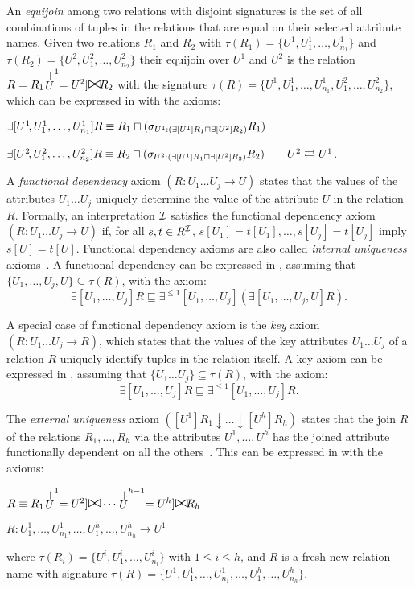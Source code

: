 \documentclass[envcountsame,draft]{llncs}
\begin{document}
An \emph{equijoin} among two relations with disjoint signatures is the set of all combinations of tuples in the relations that are equal on their selected attribute names. Given two relations $R_1$ and $R_2$ with $\tau(R_1)=\{U^1,U^1_1,\ldots,U^1_{n_1}\}$ and $\tau(R_2)=\{U^2,U^2_1,\ldots,U^2_{n_2}\}$ their equijoin over $U^1$ and $U^2$ is the relation  $R = R_1\!\stackrel[U^1=U^2]{}{\mathlarger{\mathlarger{\mathlarger{\bowtie}}}}\!R_2$ with the signature $\tau(R)=\{U^1,U^1_1,\ldots,U^1_{n_1},U^2_1,\ldots,U^2_{n_2}\}$, which can be expressed in \DLRp with the axioms:

\vspace{1ex}
$
\exists[U^1\!,U^1_1,\ldots,U^1_{n_1}]R\equiv R_1 \sqcap (\sigma_{U^1 : (\exists[U^1]R_1\sqcap \exists[U^2]R_2)} R_1)$

$
\exists[U^2\!,U^2_1,\ldots,U^2_{n_2}]R\equiv R_2 \sqcap (\sigma_{U^2 : (\exists[U^1]R_1\sqcap \exists[U^2]R_2)} R_2) \hspace{2em}U^2\rightleftarrows U^1
$.

\vspace{1ex}
A \emph{functional dependency} axiom $(R:U_1\ldots U_j \rightarrow U)$ states that the values of the attributes $U_1\ldots U_j$ uniquely determine the value of the attribute $U$ in the relation $R$. Formally, an interpretation $\mathcal{I} $ satisfies the functional dependency axiom $(R:U_1\ldots U_j \rightarrow U)$ if, for all $s,t\in R^\mathcal{I}$, $s[U_1] = t[U_1], \ldots, s[U_j] = t[U_j]$ imply $s[U] = t[U]$. Functional dependency axioms are also called \emph{internal uniqueness} axioms~\cite{halpin2008}. A functional dependency can be expressed in \DLRp, assuming that $\{U_1,\ldots, U_j, U\}\subseteq \tau(R)$, with the axiom:
%
$$\exists[U_1,\ldots, U_j]R\sqsubseteq\exists^{\leq 1}[U_1,\ldots, U_j](\exists[U_1,\ldots, U_j, U] R).$$

A special case of functional dependency axiom is the \emph{key} axiom $(R:U_1\ldots U_j \rightarrow R)$, which states that the values of the key attributes $U_1\ldots U_j$ of a relation $R$ uniquely identify tuples in the relation itself. A key axiom can be expressed in \DLRp, assuming that $\{U_1\ldots U_j\}\subseteq\tau(R)$, with the axiom:
%
$$\exists[U_1,\ldots, U_j]R\sqsubseteq\exists^{\leq 1}[U_1,\ldots, U_j]R.$$

The \emph{external uniqueness} axiom $([U^1]R_1\downarrow\ldots \downarrow [U^h]R_h)$ states that the join $R$ of the relations $R_1,\ldots,R_h$ via the attributes $U^1,\ldots,U^h$ has the joined attribute functionally dependent on all the others~\cite{halpin2008}. This can be expressed in \DLRp with the axioms:
%
\begin{center}
$R\equiv R_1\!\stackrel[U^1=U^2]{}{\mathlarger{\mathlarger{\mathlarger{\bowtie}}}}\cdots\stackrel[U^{h-1}=U^{h}]{}{\mathlarger{\mathlarger{\mathlarger{\bowtie}}}}\!R_h$

$R: U^1_{1},\ldots, U^1_{n_1},\ldots,U^h_{1},\ldots, U^h_{n_h} \rightarrow U^1$
\end{center}
%
\noindent
where $\tau(R_i)=\{U^i,U^i_1,\ldots, U^i_{n_i}\}$ with $1\leq i\leq h$, and $R$ is a fresh new relation name with signature
%
$\tau(R)=\{U^1,U^1_{1},\ldots, U^1_{n_1},\ldots,U^h_{1},\ldots, U^h_{n_h}\}$.
\end{document}
